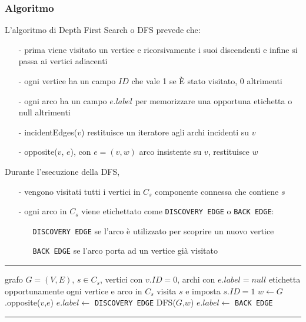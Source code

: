 \documentclass[a4paper]{article}
\makeatletter
\newenvironment{algo}[4]{
	\noindent\rule{\textwidth}{0.4pt}
	\begin{algorithmic}[1]
		\addtocounter{ALG@line}{-1}
		\Procedure{#1}{#2}
		\Require #3
		\Ensure #4
		\Statex }{
		\EndProcedure
	\end{algorithmic}
	\rule{\textwidth}{0.4pt}}
\makeatother
\begin{document}
\subsubsection*{Algoritmo}
L'algoritmo di Depth First Search o DFS prevede che:
\begin{itemize}[topsep=3pt, itemsep=0pt]
	\item[-] prima viene visitato un vertice e ricorsivamente i suoi discendenti e infine si passa ai vertici adiacenti
	\item[-] ogni vertice ha un campo \(I\!D\) che vale 1 se È stato visitato, 0 altrimenti
	\item[-] ogni arco ha un campo \(e.label\) per memorizzare una opportuna etichetta o null altrimenti
	\item[-] incidentEdges(\(v\)) restituisce un iteratore agli archi incidenti su \(v\)
	\item[-] opposite(\(v\), \(e\)), con \(e = (v,w)\) arco insistente su \(v\), restituisce \(w\)
\end{itemize}
Durante l'esecuzione della DFS,
\begin{itemize}[topsep=3pt, itemsep=0pt]
	\item[-] vengono visitati tutti i vertici in \(C_s\) componente connessa che contiene \(s\)
	\item[-] ogni arco in \(C_s\) viene etichettato come \verb|DISCOVERY EDGE| o \verb|BACK EDGE|:
	\begin{itemize}[topsep=0pt, itemsep=0pt]
		\item[] \verb|DISCOVERY EDGE| se l'arco è utilizzato per scoprire un nuovo vertice
		\item[] \verb|BACK EDGE| se l'arco porta ad un vertice già visitato
	\end{itemize}
\end{itemize}

\begin{algo}{DFS}{$G$,$s$}{grafo $G = (V,E)$, $s \in C_s$, vertici con \(v.I\!D = 0\), archi con \(e.label = null\)}{etichetta opportunamente ogni vertice e arco in \(C_s\)}
	\State visita \(s\) e imposta \(s.I\!D = 1\)
			\State \(w \gets G\).opposite(\(v\),\(e\))
				\State \(e.label \gets\) \verb|DISCOVERY EDGE|
				\State DFS(\(G\),\(w\))
			\Else
				\State \(e.label \gets\) \verb|BACK EDGE|
			\EndIf
		\EndIf
	\EndFor
\end{algo}
\end{document}
